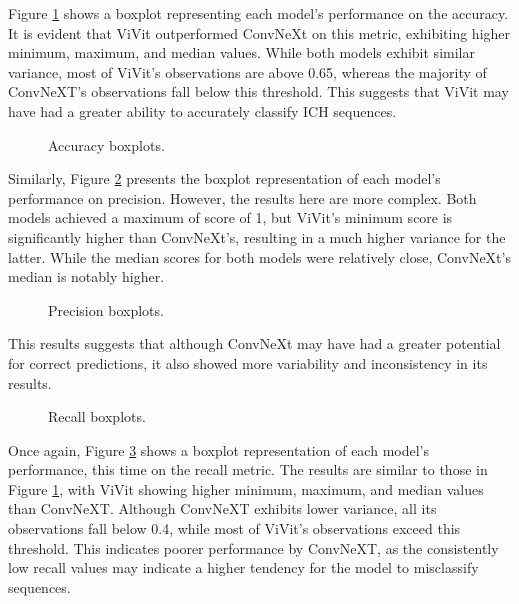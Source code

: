 
Figure \ref{fig:accuracy_bloxplot} shows a boxplot representing each model's performance on the accuracy. It is evident that ViVit outperformed ConvNeXt on this metric, exhibiting higher minimum, maximum, and median values. While both models exhibit similar variance, most of ViVit's observations are above 0.65, whereas the majority of ConvNeXT's observations fall below this threshold. This suggests that ViVit may have had a greater ability to accurately classify ICH sequences.

\begin{figure}[h]
    \centering
    \scalebox{0.7}{}
    \caption{Accuracy boxplots.}
    \label{fig:accuracy_bloxplot}
\end{figure}

Similarly, Figure \ref{fig:precision_bloxplot} presents the boxplot representation of each model’s performance on precision. However, the results here are more complex. Both models achieved a maximum of score of 1, but ViVit’s minimum score is significantly higher than ConvNeXt's, resulting in a much higher variance for the latter. While the median scores for both models were relatively close, ConvNeXt’s median is notably higher.

\begin{figure}[h]
    \centering
    \scalebox{0.7}{}
    \caption{Precision boxplots.}
    \label{fig:precision_bloxplot}
\end{figure}

This results suggests that although ConvNeXt may have had a greater potential for correct predictions, it also showed more variability and inconsistency in its results.

\begin{figure}[h]
    \centering
    \scalebox{0.7}{}
    \caption{Recall boxplots.}
    \label{fig:recall_bloxplot}
\end{figure}

Once again, Figure \ref{fig:recall_bloxplot} shows a boxplot representation of each model’s performance, this time on the recall metric. The results are similar to those in Figure \ref{fig:accuracy_bloxplot}, with ViVit showing higher minimum, maximum, and median values than ConvNeXT. Although ConvNeXT exhibits lower variance, all its observations fall below 0.4, while most of ViVit's observations exceed this threshold. This indicates poorer performance by ConvNeXT, as the consistently low recall values may indicate a higher tendency for the model to misclassify sequences.

